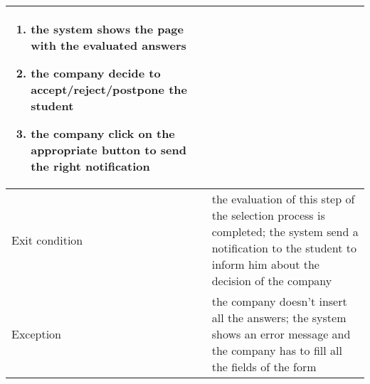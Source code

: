 \begin{table} [H]
\begin{tabular}{|| P{7.5cm} | P{7.5cm} ||}
{\begin{enumerate}
								\item the system shows the page with the evaluated answers
								\item the company decide to accept/reject/postpone the student
								\item the company click on the appropriate button to send the right notification
						\end{enumerate}} \\
						\hline 
						Exit condition & the evaluation of this step of the selection process is completed; the system send a notification to the student to inform him about the decision of the company   \\
						\hline
						Exception & the company doesn't insert all the answers; the system shows an error message and the company has to fill all the fields of the form \\
						\hline
					\end{tabular}
				\end{table}
				
